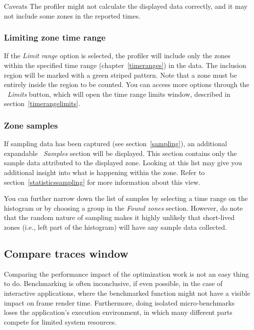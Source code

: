 \documentclass[hidelinks,titlepage,a4paper,twoside]{article}
\begin{document}
\begin{bclogo}[
noborder=true,
couleur=black!5,
logo=\bcattention
]{Caveats}
The profiler might not calculate the displayed data correctly, and it may not include some zones in the reported times.
\end{bclogo}

\subsubsection{Limiting zone time range}

If the \emph{Limit range} option is selected, the profiler will include only the zones within the specified time range (chapter~\ref{timeranges}) in the data. The inclusion region will be marked with a green striped pattern. Note that a zone must be entirely inside the region to be counted. You can access more options through the \emph{\faRuler{}~Limits} button, which will open the time range limits window, described in section~\ref{timerangelimits}.

\subsubsection{Zone samples}

If sampling data has been captured (see section~\ref{sampling}), an additional expandable \emph{\faEyeDropper{}~Samples} section will be displayed. This section contains only the sample data attributed to the displayed zone. Looking at this list may give you additional insight into what is happening within the zone. Refer to section~\ref{statisticssampling} for more information about this view.

You can further narrow down the list of samples by selecting a time range on the histogram or by choosing a group in the \emph{Found zones} section. However, do note that the random nature of sampling makes it highly unlikely that short-lived zones (i.e., left part of the histogram) will have any sample data collected.

\subsection{Compare traces window}
\label{compare}

Comparing the performance impact of the optimization work is not an easy thing to do. Benchmarking is often inconclusive, if even possible, in the case of interactive applications, where the benchmarked function might not have a visible impact on frame render time. Furthermore, doing isolated micro-benchmarks loses the application's execution environment, in which many different parts compete for limited system resources.
\end{document}
